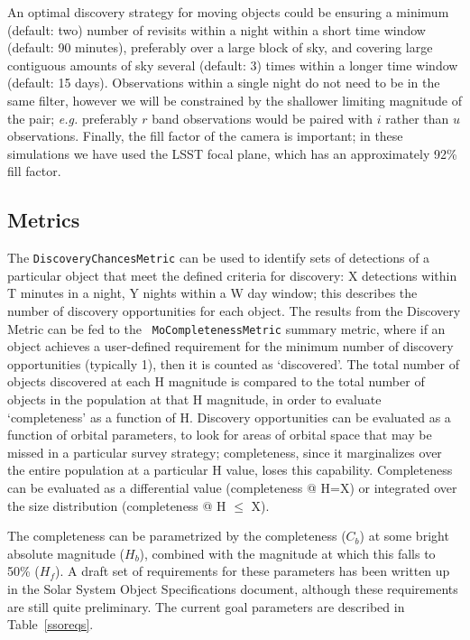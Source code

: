 An optimal discovery strategy for moving
objects could be ensuring a minimum (default: two) number of revisits
within a night within a short time window (default: 90 minutes),
preferably over a large block of sky, and
covering large contiguous amounts of sky several (default: 3) times within a
longer time window (default: 15 days).  Observations within a single
night do not need to be in the same filter, however we will be
constrained by the shallower limiting magnitude of the pair; {\it e.g.}
preferably $r$ band observations would be paired with $i$ rather than
$u$ observations. Finally, the fill factor of the camera is important;
in these simulations we have used the LSST focal plane, which has an
approximately 92\% fill factor.


\subsection{Metrics}
\label{sec:\secname:metrics}

The {\tt DiscoveryChancesMetric} can be used to identify sets of detections
of a particular object that meet the defined criteria for discovery: X
detections within T minutes in a night, Y nights within a W day
window; this describes the number of discovery opportunities for each object. The results from the Discovery Metric can be fed to the {\tt
  MoCompletenessMetric} summary metric, where if an object achieves a
user-defined requirement for the minimum number of discovery
opportunities (typically 1), then it is counted as `discovered'.
The total number of objects discovered at each H magnitude is compared
to the total number of objects in the population at that H magnitude,
in order to evaluate `completeness' as a function of H. Discovery
opportunities can be evaluated as a function of orbital parameters, to
look for areas of orbital space that may be missed in a particular
survey strategy; completeness, since it marginalizes over the entire
population at a particular H value, loses this
capability. Completeness can be evaluated as a differential value
(completeness @ H=X) or integrated over the size distribution
(completeness @ H $\leq$ X).

The completeness can be parametrized by the completeness ($C_b$) at
some bright absolute magnitude ($H_b$), combined with the magnitude at
which this falls to 50\% ($H_f$). A draft set of requirements for
these parameters has been written up in the Solar System Object
Specifications document, although these requirements are still quite
preliminary. The current goal parameters are described in Table~\ref{ssoreqs}.

